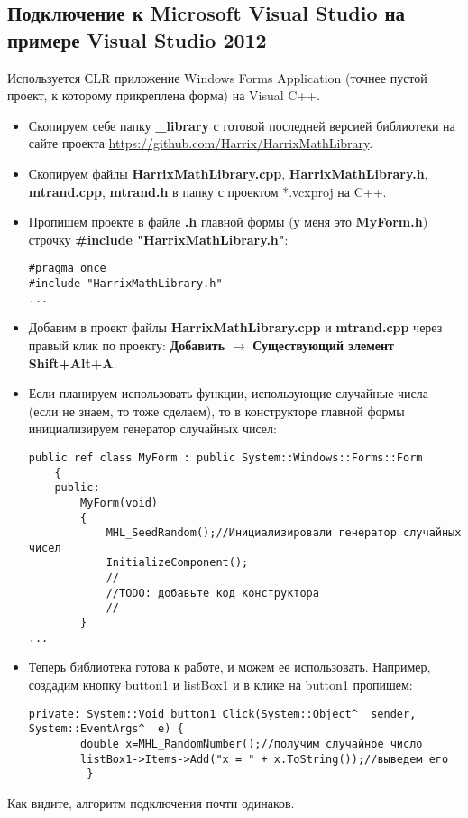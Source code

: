 \subsection{Подключение к Microsoft Visual Studio на примере Visual Studio 2012}

Используется СLR приложение Windows Forms Application (точнее пустой проект, к которому прикреплена форма) на Visual C++.

\begin{itemize}
\item Скопируем себе папку \textbf{\_library} с готовой последней версией библиотеки на сайте проекта \href{https://github.com/Harrix/HarrixMathLibrary}{https://github.com/Harrix/HarrixMathLibrary}.

\item Скопируем файлы \textbf{HarrixMathLibrary.cpp}, \textbf{HarrixMathLibrary.h}, \textbf{mtrand.cpp}, \textbf{mtrand.h} в папку с проектом *.vcxproj на C++.

\item Пропишем проекте в файле \textbf{.h} главной формы (у меня это \textbf{MyForm.h}) строчку \textbf{\#include "HarrixMathLibrary.h"}:
\begin{lstlisting}[label=install_code_07,caption=Подключение библиотеки]
#pragma once
#include "HarrixMathLibrary.h"
...
\end{lstlisting}

\item Добавим в проект файлы \textbf{HarrixMathLibrary.cpp} и \textbf{mtrand.cpp} через правый клик по проекту: \textbf{Добавить} $\rightarrow$ \textbf{Существующий элемент Shift+Alt+A}.

\item Если планируем использовать функции, использующие случайные числа (если не знаем, то тоже сделаем), то в конструкторе главной формы инициализируем генератор случайных чисел:
\begin{lstlisting}[label=install_code_08,caption=Инициализация генератора случайных чисел]
	public ref class MyForm : public System::Windows::Forms::Form
	{
	public:
		MyForm(void)
		{
			MHL_SeedRandom();//Инициализировали генератор случайных чисел
			InitializeComponent();
			//
			//TODO: добавьте код конструктора
			//
		}
...
\end{lstlisting}

\item Теперь библиотека готова к работе, и можем ее использовать. Например, создадим кнопку button1 и listBox1 и в клике на button1 пропишем:
\begin{lstlisting}[label=install_code_09,caption=Пример использования]
private: System::Void button1_Click(System::Object^  sender, System::EventArgs^  e) {
 		double x=MHL_RandomNumber();//получим случайное число
 		listBox1->Items->Add("x = " + x.ToString());//выведем его
 		 }
\end{lstlisting}
\end{itemize}

Как видите, алгоритм подключения почти одинаков.